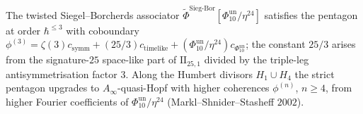 \begin{remark}
\label{rem:dc-pentagon-a-infty}
The twisted Siegel--Borcherds associator $\widetilde{\Phi}^{\mathrm{Sieg\text{-}Bor}}[\Phi_{10}^{\mathrm{un}}/\eta^{24}]$ satisfies the pentagon at order $\hbar^{\leq 3}$ with coboundary $\phi^{(3)}=\zeta(3)c_{\mathrm{symm}}+(25/3)c_{\mathrm{timelike}}+(\Phi_{10}^{\mathrm{un}}/\eta^{24})c_{\Phi_{10}^{\mathrm{un}}}$; the constant $25/3$ arises from the signature-$25$ space-like part of $\mathrm{II}_{25,1}$ divided by the triple-leg antisymmetrisation factor $3$. Along the Humbert divisors $H_1\cup H_4$ the strict pentagon upgrades to $A_\infty$-quasi-Hopf with higher coherences $\phi^{(n)}$, $n\geq 4$, from higher Fourier coefficients of $\Phi_{10}^{\mathrm{un}}/\eta^{24}$ (Markl--Shnider--Stasheff $2002$).
\end{remark}

